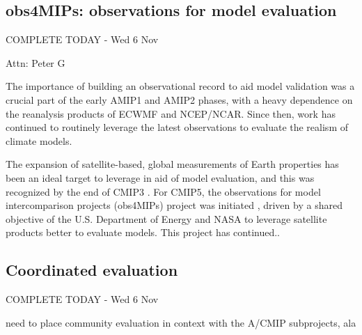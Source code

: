 \documentclass[gmd, preprint]{copernicus}
\newcommand{\mycomment}[1]{}
\def\cred#1{{\color{red}#1}}
\def\cblue#1{{\color{blue}#1}}
\begin{document}
\mycomment{
CMIP3
https://pcmdi.llnl.gov/mips/cmip/ann_20c3m.html
PCMDI IPCC 4AR simulations and forcing Curt/Karl;
https://web.archive.org/web/20040706074446/http://www-pcmdi.llnl.gov/cmip/
https://web.archive.org/web/20040827091054/http://www-pcmdi.llnl.gov/cmip/
CMIP5
https://pcmdi.llnl.gov/mips/cmip5/forcing.html
Old information CMIP paths
/Users/durack1/sync/Docs/admin/LLNL/12/120607_PaulDurack_PCMDI-CMIP5DataMeeting_LLNL.pdf
/Users/durack1/sync/Docs/admin/LLNL/17/151202_covey1_CMIP1And2/151202_covey1-CMIP1Documentation.pdf
/Users/durack1/sync/Docs/admin/LLNL/17/151202_covey1_CMIP1And2/170530_gleckler1_CMIPPaths.pdf
}


\subsection{obs4MIPs: observations for model evaluation}
\cblue{COMPLETE TODAY - Wed 6 Nov}

\cred{Attn: Peter G}

The importance of building an observational record to aid model validation was a crucial part of the early AMIP1 \citep{gates_amip_1992} and AMIP2 \citep{gleckler_amip_1996-1} phases, with a heavy dependence on the reanalysis products of ECWMF and NCEP/NCAR. Since then, work has continued to routinely leverage the latest observations to evaluate the realism of climate models.

The expansion of satellite-based, global measurements of Earth properties has been an ideal target to leverage in aid of model evaluation, and this was recognized by the end of CMIP3 \citep{gleckler_improving_2011,teixeira_satellite_2011}. For CMIP5, the observations for model intercomparison projects (obs4MIPs) project was initiated \citep{teixeira_satellite_2014}, driven by a shared objective of the U.S. Department of Energy and NASA to leverage satellite products better to evaluate models. \cred{This project has continued.. \citep{waliser_observations_2020}}



\subsection{Coordinated evaluation}
\cblue{COMPLETE TODAY - Wed 6 Nov}

\cred{need to place community evaluation in context with the A/CMIP subprojects, ala \citet{gates_amip_1992}}
\end{document}
